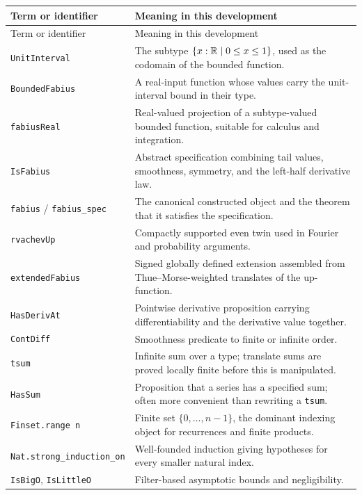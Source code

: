 \documentclass[11pt,oneside]{article}
\theoremstyle{definition}
\theoremstyle{remark}
\begin{document}
\begin{longtable}{>{\raggedright\arraybackslash}p{} >{\raggedright\arraybackslash}p{}}
\toprule
Term or identifier & Meaning in this development \\
\midrule
\endfirsthead
\toprule
Term or identifier & Meaning in this development \\
\midrule
\endhead
\nolinkurl{UnitInterval} & The subtype \(\{x:\mathbb{R}\mid0\leq x\leq1\}\), used as the codomain of the bounded function. \\
\nolinkurl{BoundedFabius} & A real-input function whose values carry the unit-interval bound in their type. \\
\nolinkurl{fabiusReal} & Real-valued projection of a subtype-valued bounded function, suitable for calculus and integration. \\
\nolinkurl{IsFabius} & Abstract specification combining tail values, smoothness, symmetry, and the left-half derivative law. \\
\nolinkurl{fabius} / \nolinkurl{fabius_spec} & The canonical constructed object and the theorem that it satisfies the specification. \\
\nolinkurl{rvachevUp} & Compactly supported even twin used in Fourier and probability arguments. \\
\nolinkurl{extendedFabius} & Signed globally defined extension assembled from Thue--Morse-weighted translates of the up-function. \\
\nolinkurl{HasDerivAt} & Pointwise derivative proposition carrying differentiability and the derivative value together. \\
\nolinkurl{ContDiff} & Smoothness predicate to finite or infinite order. \\
\nolinkurl{tsum} & Infinite sum over a type; translate sums are proved locally finite before this is manipulated. \\
\nolinkurl{HasSum} & Proposition that a series has a specified sum; often more convenient than rewriting a \nolinkurl{tsum}. \\
\nolinkurl{Finset.range n} & Finite set \(\{0,\dots,n-1\}\), the dominant indexing object for recurrences and finite products. \\
\nolinkurl{Nat.strong_induction_on} & Well-founded induction giving hypotheses for every smaller natural index. \\
\nolinkurl{IsBigO}, \nolinkurl{IsLittleO} & Filter-based asymptotic bounds and negligibility. \\

\end{longtable}
\end{document}
